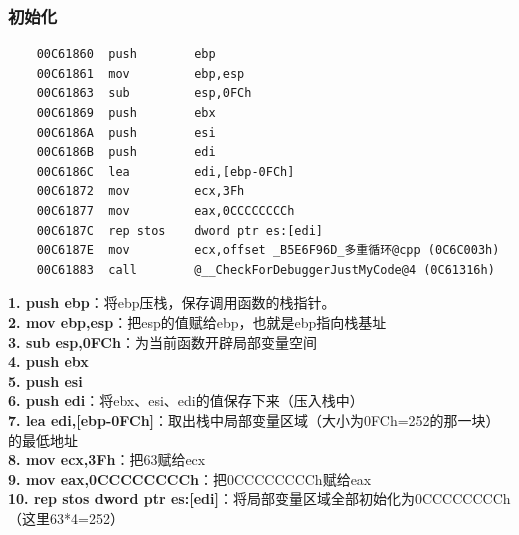 \subsubsection{初始化}
\begin{lstlisting}
    00C61860  push        ebp  
    00C61861  mov         ebp,esp  
    00C61863  sub         esp,0FCh  
    00C61869  push        ebx  
    00C6186A  push        esi  
    00C6186B  push        edi  
    00C6186C  lea         edi,[ebp-0FCh]  
    00C61872  mov         ecx,3Fh  
    00C61877  mov         eax,0CCCCCCCCh  
    00C6187C  rep stos    dword ptr es:[edi]  
    00C6187E  mov         ecx,offset _B5E6F96D_多重循环@cpp (0C6C003h)  
    00C61883  call        @__CheckForDebuggerJustMyCode@4 (0C61316h) 
\end{lstlisting}
{\bfseries 1. push ebp}：将ebp压栈，保存调用函数的栈指针。
\\{\bfseries 2. mov ebp,esp}：把esp的值赋给ebp，也就是ebp指向栈基址
\\{\bfseries 3. sub esp,0FCh}：为当前函数开辟局部变量空间
\\{\bfseries 4. push ebx}
\\{\bfseries 5. push esi}
\\{\bfseries 6. push edi}：将ebx、esi、edi的值保存下来（压入栈中）
\\{\bfseries 7. lea edi,[ebp-0FCh]}：取出栈中局部变量区域（大小为0FCh=252的那一块）的最低地址
\\{\bfseries 8. mov ecx,3Fh}：把63赋给ecx
\\{\bfseries 9. mov eax,0CCCCCCCCh}：把0CCCCCCCCh赋给eax
\\{\bfseries 10. rep stos dword ptr es:[edi]}：将局部变量区域全部初始化为0CCCCCCCCh（这里63*4=252）

